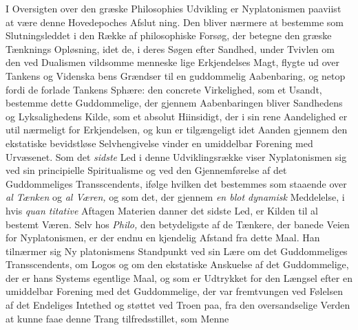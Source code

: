 I Oversigten over den græske Philosophies Udvikling er
Nyplatonismen paaviist at være denne Hovedepoches Afslut\-%
ning. Den bliver nærmere at bestemme som Slutningsleddet
i den Række af philosophiske Forsøg, der betegne den græske
Tænknings Opløsning, idet de, i deres Søgen efter Sandhed,
under Tvivlen om den ved Dualismen vildsomme menneske\-%
lige Erkjendelses Magt, flygte ud over Tankens og Videnska\-%
bens Grændser til en guddommelig Aabenbaring, og netop
fordi de forlade Tankens Sphære: den concrete Virkelighed,
som et Usandt, bestemme dette Guddommelige, der gjennem
Aabenbaringen bliver Sandhedens og Lyksalighedens Kilde,
som et absolut Hiinsidigt, der i sin rene Aandelighed er util\-%
nærmeligt for Erkjendelsen, og kun er tilgængeligt idet Aanden
gjennem den ekstatiske bevidstløse Selvhengivelse vinder
en umiddelbar Forening med Urvæsenet. Som det \emph{sidste}
Led i denne Udviklingsrække viser Nyplatonismen sig ved sin
principielle Spiritualisme og ved den Gjennemførelse af det
Guddommeliges Transscendents, ifølge hvilken det bestemmes
som staaende over \emph{al Tænken} og \emph{al Væren,} og som det,
der gjennem \emph{en blot dynamisk} Meddelelse, i hvis \emph{quan\-%
titative} Aftagen Materien danner det sidste Led, er Kilden
til al bestemt Væren. Selv hos \emph{Philo,} den betydeligste af
de Tænkere, der banede Veien for Nyplatonismen, er der endnu
en kjendelig Afstand fra dette Maal. Han tilnærmer sig Ny\-%
platonismens Standpunkt ved sin Lære om det Guddommeliges
Transscendents, om Logos og om den ekstatiske Anskuelse af
det Guddommelige, der er hans Systems egentlige Maal, og som
er Udtrykket for den Længsel efter en umiddelbar Forening med
det Guddommelige, der var fremtvungen ved Følelsen af det
Endeliges Intethed og støttet ved Troen paa, fra den oversandselige
Verden at kunne faae denne Trang tilfredsstillet, som Menne\-%
